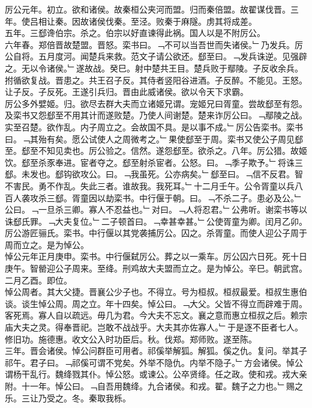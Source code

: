 \documentclass{zhvt-classic}
\begin{document}
\hspace*{2em}厉公元年。初立。欲和诸侯。故秦桓公夹河而盟。归而秦倍盟。故翟谋伐晋。三年。使吕相让秦。因故诸侯伐秦。至泾。败秦于麻隧。虏其将成差。\\
\hspace*{2em}五年。三郄谗伯宗。杀之。伯宗以好直谏得此祸。国人以是不附厉公。\\
\hspace*{2em}六年春。郑倍晋故楚盟。晋怒。栾书曰。﹁不可以当吾世而失诸侯。﹂乃发兵。厉公自将。五月度河。闻楚兵来救。范文子请公欲还。郄至曰。﹁发兵诛逆。见强辟之。无以令诸侯。﹂遂故战。癸巳。射中楚共王目。楚兵败于鄢陵。子反收余兵。拊循欲复战。晋患之。共王召子反。其侍者竖阳谷进酒。子反醉。不能见。王怒。让子反。子反死。王遂引兵归。晋由此威诸侯。欲以令天下求霸。\\
\hspace*{2em}厉公多外嬖姬。归。欲尽去群大夫而立诸姬兄谓。宠姬兄曰胥童。尝故郄至有怨。及栾书又怨郄至不用其计而遂败楚。乃使人间谢楚。楚来诈厉公曰。﹁鄢陵之战。实至召楚。欲作乱。内子周立之。会故国不具。是以事不成。﹂厉公告栾书。栾书曰。﹁其殆有矣。愿公试使人之周微考之。﹂果使郄至于周。栾书又使公子周见郄至。郄至不知见卖也。厉公验之。信然。遂怨郄至。欲杀之。八年。厉公猎。故姬饮。郄至杀豕奉进。宦者夺之。郄至射杀宦者。公怒。曰。﹁季子欺予。﹂将诛三郄。未发也。郄钩欲攻公。曰。﹁我虽死。公亦病矣。﹂郄至曰。﹁信不反君。智不害民。勇不作乱。失此三者。谁故我。我死耳。﹂十二月壬午。公令胥童以兵八百人袭攻杀三郄。胥童因以劫栾书。中行偃于朝。曰。﹁不杀二子。患必及公。﹂公曰。﹁一旦杀三卿。寡人不忍益也。﹂对曰。﹁人将忍君。﹂公弗听。谢栾书等以诛郄氏罪。﹁大夫复位。﹂二子顿首曰。﹁幸甚幸甚。﹂公使胥童为卿。闰月乙卯。厉公游匠骊氏。栾书。中行偃以其党袭捕厉公。囚之。杀胥童。而使人迎公子周于周而立之。是为悼公。\\
\hspace*{2em}悼公元年正月庚申。栾书。中行偃弑厉公。葬之以一乘车。厉公囚六日死。死十日庚午。智罃迎公子周来。至绛。刑鸡故大夫盟而立之。是为悼公。辛巳。朝武宫。二月乙酉。即位。\\
\hspace*{2em}悼公周者。其大父捷。晋襄公少子也。不得立。号为桓叔。桓叔最爱。桓叔生惠伯谈。谈生悼公周。周之立。年十四矣。悼公曰。﹁大父。父皆不得立而辟难于周。客死焉。寡人自以疏远。毋几为君。今大夫不忘文。襄之意而惠立桓叔之后。赖宗庙大夫之灵。得奉晋祀。岂敢不战战乎。大夫其亦佐寡人。﹂于是逐不臣者七人。修旧功。施德惠。收文公入时功臣后。秋。伐郑。郑师败。遂至陈。\\
\hspace*{2em}三年。晋会诸侯。悼公问群臣可用者。祁傒举解狐。解狐。傒之仇。复问。举其子祁午。君子曰。﹁祁傒可谓不党矣。外举不隐仇。内举不隐子。﹂方会诸侯。悼公谓杨干乱行。魏绛戮其仆。悼公怒。或谏公。公卒贤绛。任之政。使和戎。戎大亲附。十一年。悼公曰。﹁自吾用魏绛。九合诸侯。和戎。翟。魏子之力也。﹂赐之乐。三让乃受之。冬。秦取我栎。\\
\end{document}
